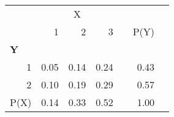 \begin{normalsize}
\color{black}
\begin{tabular}{rrrrcrc}
\hline
\cellcolor{white} &\multicolumn{3}{c}{X}&&\multicolumn{1}{c}{}\\ 
\cline{2-4}
&1&2&3&&\cellcolor{amber}P(Y)\\ 
\hline
\multicolumn{6}{l}{\textbf{Y}}\\ 
\cline{1-6}
1&0.05&0.14&0.24&&\cellcolor{amber}0.43\\ 
2&0.10&0.19&0.29&&\cellcolor{amber}0.57\\ 
\cellcolor{pink}P(X)&\cellcolor{pink}0.14&\cellcolor{pink}0.33&\cellcolor{pink}0.52&\cellcolor{pink}&\cellcolor{orangecolorwheel}1.00\\ 
\hline
\end{tabular}
\end{normalsize}
\color{black}
